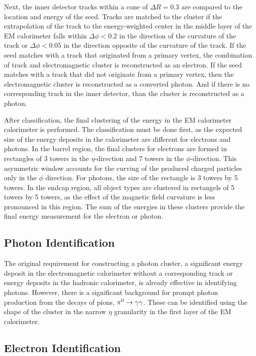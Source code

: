 Next, the inner detector tracks within a cone of $\Delta R = 0.3$ are compared to the location and energy of the seed.
Tracks are matched to the cluster if the extrapolation of the track to the energy-weighted center in the middle layer of the \ac{EM} calorimeter falls within $\Delta\phi < 0.2$ in the direction of the curvature of the track or $\Delta\phi < 0.05$ in the direction opposite of the curvature of the track.
If the seed matches with a track that originated from a primary vertex, the combination of track and electromagnetic cluster is reconstructed as an electron.
If the seed matches with a track that did not originate from a primary vertex, then the electromagnetic cluster is reconstructed as a converted photon.
And if there is no corresponding track in the inner detector, than the cluster is reconstructed as a photon.

After classification, the final clustering of the energy in the \ac{EM} calorimeter calorimeter is performed.
The classification must be done first, as the expected size of the energy deposits in the calorimeter are different for electrons and photons.
In the barrel region, the final clusters for electrons are formed in rectangles of 3 towers in the $\eta$-direction and 7 towers in the $\phi$-direction.
This asymmetric window accounts for the curving of the produced charged particles only in the $\phi$ direction.
For photons, the size of the rectangle is 3 towers by 5 towers.
In the endcap region, all object types are clustered in rectangels of 5 towers by 5 towers, as the effect of the magnetic field curvature is less pronounced in this region.
The sum of the energies in these clusters provide the final energy measurement for the electron or photon.

\subsection{Photon Identification}

The original requirement for constructing a photon cluster, a significant energy deposit in the electromagnetic calorimeter without a corresponding track or energy deposits in the hadronic calorimeter, is already effective in identifying photons.
However, there is a significant background for prompt photon production from the decays of pions, $\pi^0 \rightarrow \gamma\gamma$.
These can be identified using the shape of the cluster in the narrow $\eta$ granularity in the first layer of the \ac{EM} calorimeter.

\subsection{Electron Identification}

